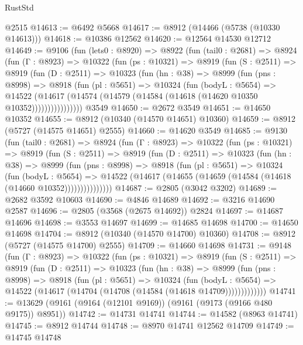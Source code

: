 \begin{lexlean}{RustStd}
\begin{coremodule}
    @2515
@14613 := @6492 @5668
@14617 := @8912 (@14466 (@5738 (@10330 @14613)))
@14618 := @10386 @12562
@14620 := @12564 @14530 @12712
@14649 := @9106
    (fun (lets0 : @8920) =>
    @8922
      (fun (tail0 : @2681) =>
      @8924
        (fun (Γ : @8923) =>
        @10322
          (fun (ps : @10321) =>
          @8919
            (fun (S : @2511) =>
            @8919
              (fun (D : @2511) =>
              @10323
                (fun (hn : @38) =>
                @8999
                  (fun (pns : @8998) =>
                  @8918
                    (fun (pl : @5651) =>
                    @10324
                      (fun (bodyL : @5654) =>
                      @14522
                        (@14617
                          (@14574 (@14579 (@14584 (@14618 (@14620 @10350 @10352))))))))))))))))
    @3549
@14650 := @2672 @3549
@14651 := @14650 @10352
@14655 := @8912 (@10340 (@14570 @14651) @10360)
@14659 := @8912 (@5727 (@14575 @14651) @2555)
@14660 := @14620 @3549
@14685 := @9130
    (fun (tail0 : @2681) =>
    @8924
      (fun (Γ : @8923) =>
      @10322
        (fun (ps : @10321) =>
        @8919
          (fun (S : @2511) =>
          @8919
            (fun (D : @2511) =>
            @10323
              (fun (hn : @38) =>
              @8999
                (fun (pns : @8998) =>
                @8918
                  (fun (pl : @5651) =>
                  @10324
                    (fun (bodyL : @5654) =>
                    @14522 (@14617 (@14655 (@14659 (@14584 (@14618 (@14660 @10352)))))))))))))))
@14687 := @2805 (@3042 @3202)
@14689 := @2682 @3592 @10603
@14690 := @4846 @14689
@14692 := @3216 @14690 @2587
@14696 := @2805 (@3568 (@2675 @14692)) @2824
@14697 := @14687 @14696
@14698 := @3553 @14697
@14699 := @14685 @14698
@14700 := @14650 @14698
@14704 := @8912 (@10340 (@14570 @14700) @10360)
@14708 := @8912 (@5727 (@14575 @14700) @2555)
@14709 := @14660 @14698
@14731 := @9148
    (fun (Γ : @8923) =>
    @10322
      (fun (ps : @10321) =>
      @8919
        (fun (S : @2511) =>
        @8919
          (fun (D : @2511) =>
          @10323
            (fun (hn : @38) =>
            @8999
              (fun (pns : @8998) =>
              @8918
                (fun (pl : @5651) =>
                @10324
                  (fun (bodyL : @5654) =>
                  @14522 (@14617 (@14704 (@14708 (@14584 (@14618 @14709)))))))))))))
@14741 := @13629 (@9161 (@9164 (@12101 @9169)) (@9161 (@9173 (@9166 @480 @9175)) @8951))
@14742 := @14731 @14741
@14744 := @14582 (@8963 @14741)
@14745 := @8912 @14744
@14748 := @8970 @14741 @12562 @14709
@14749 := @14745 @14748

\end{coremodule}
\end{lexlean}
